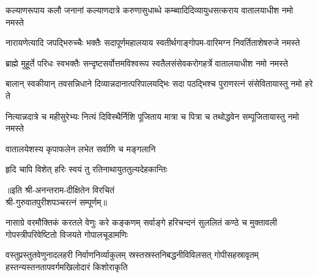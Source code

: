 
\twolineshloka
{कल्याणरूपाय कलौ जनानां कल्याणदात्रे करुणासुधाब्धे}
{कम्ब्वादिदिव्यायुधसत्कराय वातालयाधीश नमो नमस्ते}

\twolineshloka
{नारायणेत्यादि जपद्भिरुच्चैः भक्तैः सदापूर्णमहालयाय}
{स्वतीर्थगाङ्गोपम-वारिमग्न निवर्तिताशेषरुजे नमस्ते}

\twolineshloka
{ब्राह्मे मुहूर्ते परिधः स्वभक्तैः सन्दृष्टसर्वोत्तमविश्वरूप}
{स्वतैलसंसेवकरोगहर्त्रे वातालयाधीश नमो नमस्ते}

\twolineshloka
{बालान् स्वकीयान् तवसन्निधाने दिव्यान्नदानात्परिपालयद्भिः}
{सदा पठद्भिश्च पुराणरत्नं संसेवितायास्तु नमो हरे ते}

\twolineshloka
{नित्यान्नदात्रे च महीसुरेभ्यः नित्यं दिविस्थैर्निशि पूजिताय}
{मात्रा च पित्रा च तथोद्धवेन सम्पूजितायास्तु नमो नमस्ते}

{वातालयेशस्य कृपाफलेन लभेत सर्वाणि च मङ्गलानि}

{हृदि चापि विशेत् हरिः स्वयं तु रतिनाथायुततुल्यदेहकान्तिः}

॥इति श्री-अनन्तराम-दीक्षितेन विरचितं\\ श्री-गुरुवातपुरीशपञ्चरत्नं सम्पूर्णम्‌॥

\closesection
\setlength{\shlokaspaceskip}{6pt}
{नासाग्रे वरमौक्तिकं करतले वेणुः करे कङ्कणम्}
{सर्वाङ्गे हरिचन्दनं सुललितं कण्ठे च मुक्तावली}
{गोपस्त्रीपरिवेष्टितो विजयते गोपालचूडामणिः}

{वस्तुप्रस्तुतवेणुनादलहरी निर्वाणनिर्व्याकुलम्}
{स्रस्तस्रस्तनिबद्धनीविविलसत् गोपीसहस्रावृतम्}
{हस्तन्यस्तनतापवर्गमखिलोदारं किशोराकृति}


\setlength{\shlokaspaceskip}{24pt}